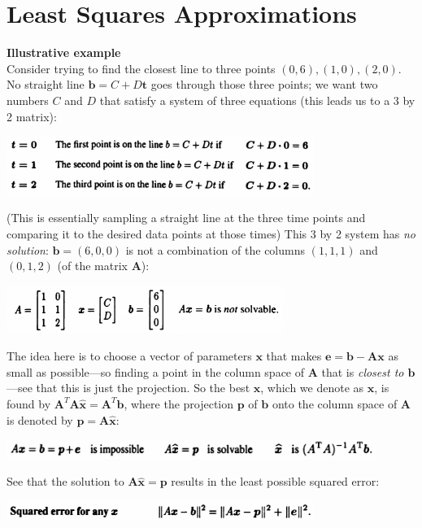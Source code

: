 \documentclass{report}
\begin{document}
\section{Least Squares Approximations}
\textbf{Illustrative example}\\
Consider trying to find the closest line to three points $(0,6),(1,0),(2,0)$. No straight line $\bm b=C+D\bm t$ goes through those three points; we want two numbers $C$ and
$D$ that satisfy a system of three equations (this leads us to a 3 by 2 matrix):
\begin{center}
\includegraphics[width=10cm]{63}
\end{center}
(This is essentially sampling a straight line at the three time points and comparing it to the desired data points at those times)
This 3 by 2 system has \textit{no solution}: $\bm b=(6,0,0)$ is not a combination of the columns $(1,1,1)$ and $(0,1,2)$ (of the matrix $\bm A$):
\begin{center}
\includegraphics[width=9cm]{64}
\end{center}
The idea here is to choose a vector of parameters $\bm x$ that makes $\bm e=\bm b-\bm{Ax}$ as small as possible---so finding a point in the column space of $\bm A$ that is
\textit{closest to $\bm b$}---see that this is just the projection. So the best $\bm x$, which we denote as $\hat{\bm x}$, is found by
$\bm A^T\bm A\hat{\bm x}=\bm{A}^T\bm b$, where the projection $\bm p$ of $\bm b$ onto the column space of $\bm A$ is denoted by $\bm p=\bm A\hat{\bm x}$:
\begin{center}
\includegraphics[width=12cm]{65}
\end{center}
See that the solution to $\bm A\hat{\bm x}=\bm p$ results in the least possible squared error:
\begin{center}
\includegraphics[width=10cm]{66}
\end{center}
\end{document}
